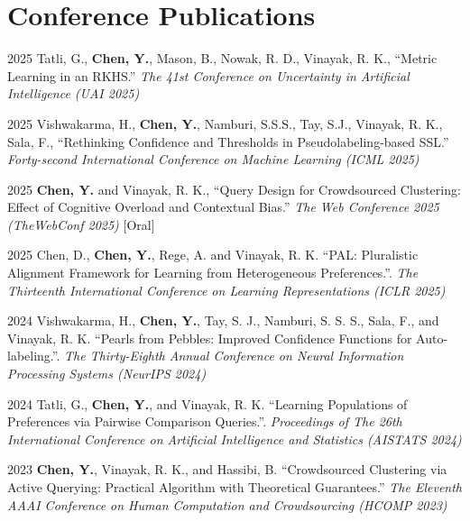 \documentclass[11pt,letterpaper]{report}
\begin{document}
    \section*{Conference Publications}
    
    \begin{tablist}

        \item[2025]  \tab{} Tatli, G., \textbf{Chen, Y.}, Mason, B., Nowak, R. D., Vinayak, R. K., \enquote{Metric Learning in an RKHS.}  \textit{The 41st Conference on Uncertainty in Artificial Intelligence (UAI 2025)}
        
        \item[2025]  \tab{} Vishwakarma, H., \textbf{Chen, Y.}, Namburi, S.S.S., Tay, S.J., Vinayak, R. K., Sala, F., \enquote{Rethinking Confidence and Thresholds in Pseudolabeling-based SSL.}  \textit{Forty-second International Conference on Machine Learning (ICML 2025)}


        \item[2025]  \tab{} \textbf{Chen, Y.} and Vinayak, R. K., \enquote{Query Design for Crowdsourced Clustering: Effect of Cognitive Overload and Contextual Bias.}  \textit{The Web Conference 2025 (TheWebConf 2025)} [Oral]
    
        \item[2025] \tab{}Chen, D., \textbf{Chen, Y.}, Rege, A. and Vinayak, R. K. \enquote{PAL: Pluralistic Alignment Framework for Learning from Heterogeneous Preferences.}. \textit{The Thirteenth International Conference on Learning Representations (ICLR 2025)} 
        
        \item[2024] \tab{}Vishwakarma, H., \textbf{Chen, Y.}, Tay, S. J., Namburi, S. S. S., Sala, F., and Vinayak, R. K. \enquote{Pearls from Pebbles: Improved Confidence Functions for Auto-labeling.}. \textit{The Thirty-Eighth Annual Conference on Neural Information Processing Systems (NeurIPS 2024)}

        \item[2024] \tab{}Tatli, G., \textbf{Chen, Y.}, and Vinayak, R. K. \enquote{Learning Populations of Preferences via Pairwise Comparison Queries.}. \textit{Proceedings of The 26th International Conference on Artificial Intelligence and Statistics (AISTATS 2024)}

        \item[2023] \tab{}\textbf{Chen, Y.}, Vinayak, R. K., and Hassibi, B. \enquote{Crowdsourced Clustering via Active Querying: Practical Algorithm with Theoretical Guarantees.} \textit{The Eleventh AAAI Conference on Human Computation and Crowdsourcing (HCOMP 2023)}

    \end{tablist}
\end{document}
